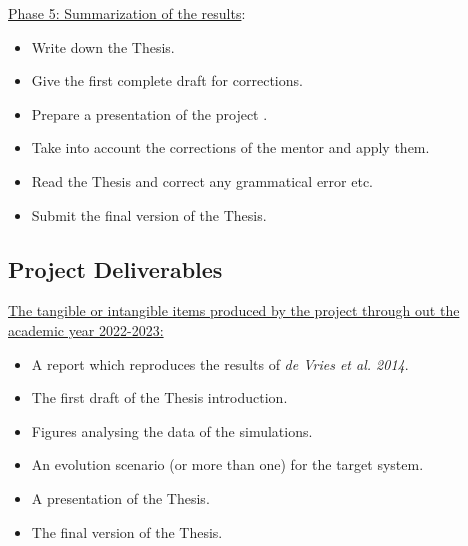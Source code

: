 \documentclass{uva-inf-article}
\numberwithin{equation}{section}
\begin{document}
\hspace*{-0.7cm}\underline{Phase 5: Summarization of the results}:
\begin{itemize}
    \item Write down the Thesis.
    \item Give the first complete draft for corrections.
    \item Prepare a presentation of the project .
    \item Take into account the corrections of the mentor and apply them.
    \item Read the Thesis and correct any grammatical error etc.
    \item Submit the final version of the Thesis.
\end{itemize}

\subsection{Project Deliverables}
\underline{The tangible or intangible items produced by the project through out the academic year 2022-2023:}\\
\vspace{0.1cm}
\begin{itemize}
    \item A report which reproduces the results of {\it de Vries et al. 2014}.
    \item The first draft of the Thesis introduction.
    \item Figures analysing the data of the simulations.
    \item An evolution scenario (or more than one) for the target system.
    \item A presentation of the Thesis.
    \item The final version of the Thesis.
\end{itemize}




\end{document}
